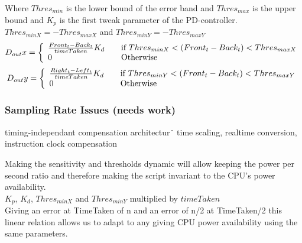 \documentclass[a4paper]{article}
\begin{document}
Where $Thres_{min}$ is the lower bound of the error band and $Thres_{max}$ is the upper bound
and $K_p$ is the  first tweak parameter of the PD-controller.\\
$Thres_{min X} = -Thres_{max X}$ and
$Thres_{min Y} = -Thres_{max Y}$
\[
  D_{out}x = \left\{ 
  \begin{array}{l l}
      \frac{Front_t - Back_t}{timeTaken}K_d& \quad \text{if $Thres_{min X} < (Front_t - Back_t) < Thres_{max X}$}\\ 
     0& \quad \text{Otherwise}\\
  \end{array} \right.
\]
\[
  D_{out}y = \left\{ 
  \begin{array}{l l}
     \frac{Right_t - Left_t}{timeTaken}K_d& \quad \text{if $Thres_{min Y} < (Front_t - Back_t) < Thres_{max Y}$}\\ 
     0& \quad \text{Otherwise}\\
  \end{array} \right.
\]

\subsubsection{Sampling Rate Issues (needs work)}

timing-independant compensation architectur¨
time scaling, realtime conversion, instruction clock compensation

Making the sensitivity and thresholds dynamic will allow keeping the power per second ratio and therefore making the script invariant to the CPU’s power availability.\\
$K_p$, $K_d$, $Thres_{min X}$ and $Thres_{min Y}$ multiplied by $timeTaken$\\
Giving an error at TimeTaken of n and an error of n/2 at TimeTaken/2 this linear relation allows us to adapt to any giving CPU power availability using the same parameters. 
\end{document}
